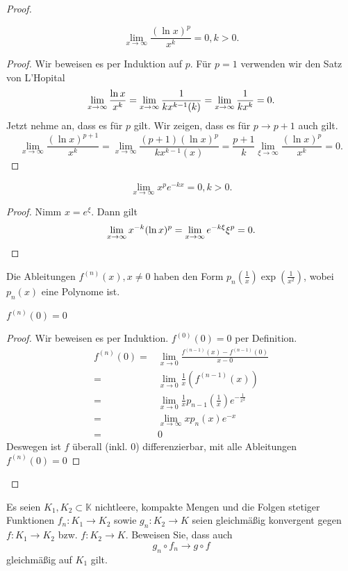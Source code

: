 \begin{proof}
\begin{enumerate}[label=\roman*)]
\begin{Lemma}
				\[
				\lim_{x \to \infty} \frac{(\ln x)^p}{x^k}=0, k > 0
				.\] 
			\end{Lemma}
			\begin{proof}
				Wir beweisen es per Induktion auf $p$. F\"{u}r $p=1$ verwenden wir den Satz von L'Hopital
				\[
					\lim_{x \to \infty} \frac{\ln x}{x^k}=\lim_{x \to \infty} \frac{1}{kx^{k-1}(k)}=\lim_{x \to \infty} \frac{1}{kx^k}=0
				.\qedhere\] 
				Jetzt nehme an, dass es f\"{u}r $p$ gilt. Wir zeigen, dass es f\"{u}r $p\to p+1$ auch gilt. 
				\[
					\lim_{x \to \infty} \frac{(\ln x)^{p+1}}{x^k}=\lim_{x \to \infty} \frac{(p+1)(\ln x)^p}{kx^{k-1}(x)}=\frac{p+1}{k}\lim_{\xi \to \infty} \frac{(\ln x)^p}{x^k}=0
				.\] 
			\end{proof}
			\begin{Lemma}
			\[
				\lim_{x \to \infty} x^p e^{-kx}=0, k>0
			.\] 	
			\end{Lemma}
			\begin{proof}
				Nimm $x=e^\xi$. Dann gilt
				\[
					\lim_{x \to \infty} x^{-k}(\ln x)^p=\lim_{x \to \infty} e^{-k\xi}\xi^p=0
				.\qedhere\] 
			\end{proof}
			Die Ableitungen $f^{(n)}(x), x\neq 0$ haben den Form $p_n\left( \frac{1}{x} \right) \exp\left( \frac{1}{x^2} \right) $, wobei $p_n(x)$ eine Polynome ist. 
			\begin{Proposition}
				$f^{(n)}(0)=0$
			\end{Proposition}
			\begin{proof}
				Wir beweisen es per Induktion. $f^{(0)}(0)=0$ per Definition.
				\begin{align*}
					f^{(n)}(0)=&\lim_{x \to 0} \frac{f^{(n-1)}(x)-f^{(n-1)}(0)}{x-0}\\
					=&\lim_{x \to 0}  \frac{1}{x}\left( f^{(n-1)}(x) \right)\\
					=&\lim_{x \to 0} \frac{1}{x}p_{n-1}\left(\frac{1}{x}\right)e^{-\frac{1}{x^2}}\\
					=&\lim_{x \to \infty} xp_n(x)e^{-x}\\
					=&0
				\end{align*}
				Deswegen ist $f$ überall (inkl. 0) differenzierbar, mit alle Ableitungen $f^{(n)}(0)=0$
			\end{proof}
	\end{enumerate}
\end{proof}
\begin{Problem}
	Es seien $K_1 , K_2 \subset \mathbb{K}$  nichtleere, kompakte Mengen und die Folgen stetiger Funktionen $f_n : K_1 \to K_2$ sowie $g_n : K_2 \to K$  seien gleichmäßig konvergent gegen $f : K_1 \to K_2$ bzw. $f : K_2 \to K$. Beweisen Sie, dass auch
	\[
	g_n\circ f_n \to g \circ f\]
	gleichmäßig auf $K_1$ gilt.
\end{Problem}

